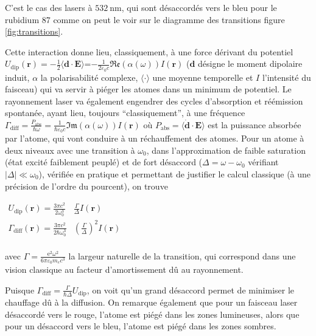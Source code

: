 \documentclass[11pt,a4paper] { article}
\newcommand{\lmbd}[1]{$\SI{#1}{\nano\metre}$}
\newcommand{\e}[1]{\text{e}^{#1}}
\newcommand{\mathsc}[1]{\mathrm{\scriptscriptstyle {#1}}}
\renewcommand{\v}[1]{\boldsymbol{\mathbf{#1}}}
\newenvironment{salign}{
\centering
  $ \displaystyle
    \begin{aligned} 
}
{
    \end{aligned}  $ 
\par
}
\begin{document}
C'est le cas des lasers à \lmbd{532}, qui sont désaccordés vers le bleu pour le rubidium 87 comme on peut le voir sur le diagramme des transitions figure \ref{fig:transitions}.

Cette interaction donne lieu, classiquement, à une force dérivant du potentiel $U_\mathsc{dip}(\v r) = -\frac12 \langle \v d \cdot \v E \rangle$=$-\frac{1}{2\varepsilon_0 c}\mathfrak{Re}\left(\alpha(\omega)\right) I(\v r)$ ($\v d$ désigne le moment dipolaire induit, $\alpha$ la polarisabilité complexe, $\langle \cdot \rangle$ une moyenne temporelle et $I$ l'intensité du faisceau)
qui va servir à piéger les atomes dans un minimum de potentiel. Le rayonnement laser va également engendrer des cycles d'absorption et réémission spontanée, ayant lieu, toujours ``classiquement'', à une fréquence $\Gamma_\mathsc{diff} = \frac{P_\mathsc{abs}}{\hbar \omega} = \frac{1}{\hbar \varepsilon_0 c} \mathfrak{Im}\left(\alpha(\omega)\right) I(\v r)$ où $P_\mathsc{abs} = \langle \dot{\v d} \cdot \v E \rangle$ est la puissance absorbée par l'atome, qui vont conduire à un réchauffement des atomes. 
Pour un atome à deux niveaux avec une transition à $\omega_0$, dans l'approximation de faible saturation (état excité faiblement peuplé) et de fort désaccord ($\Delta = \omega - \omega_0$ vérifiant $|\Delta| \ll \omega_0$), vérifiée en pratique et permettant de justifier le calcul classique (à une précision de l'ordre du pourcent), on trouve

\begin{salign}
	U_\mathsc{dip}(\v r)=\frac{3\pi c^2}{2\omega_0^3} & \frac{\Gamma}{\Delta} I(\v r) \\
	\Gamma_\mathsc{diff}(\v r)=\frac{3\pi c^2}{2\hbar\omega_0^3} & \left(\frac{\Gamma}{\Delta}\right)^2 I(\v r) \\
\end{salign}

avec $\Gamma = \frac{\e 2 \omega^2}{6 \pi \varepsilon_0 m_e c^3}$ la largeur naturelle de la transition, qui correspond dans une vision classique au facteur d'amortissement dû au rayonnement.

Puisque $\Gamma_\mathsc{diff}=\frac{\Gamma}{\hbar \Delta} U_\mathsc{dip}$, on voit qu'un grand désaccord permet de minimiser le chauffage dû à la diffusion. On remarque également que pour un faisceau laser désaccordé vers le rouge, l'atome est piégé dans les zones lumineuses, alors que pour un désaccord vers le bleu, l'atome est piégé dans les zones sombres.
\end{document}

